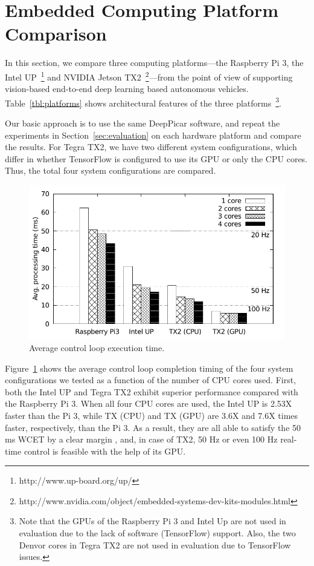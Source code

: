 
%

\section{Embedded Computing Platform Comparison}\label{sec:comparison}

In this section, we compare three computing platforms---the Raspberry
Pi 3, the Intel UP~\footnote{http://www.up-board.org/up/} and NVIDIA
Jetson
TX2~\footnote{http://www.nvidia.com/object/embedded-systems-dev-kits-modules.html}---from
the point of view of supporting vision-based end-to-end deep learning
based autonomous vehicles. 
Table~\ref{tbl:platforms} shows architectural features of the three
platforms~\footnote{Note that the GPUs of the Raspberry Pi 3 and Intel
  Up are not used in evaluation due to the lack of software (TensorFlow)
support. Also, the two Denvor cores in Tegra TX2 are not used in
evaluation due to TensorFlow issues.}.
  
Our basic approach is to use the same DeepPicar software, and repeat
the experiments in Section~\ref{sec:evaluation} on each hardware
platform and compare the results. 
For Tegra TX2, we have two different system configurations,
which differ in whether TensorFlow is configured to use its GPU or
only the CPU cores. Thus, the total four system configurations are
compared.

\begin{figure}[h]
  \centering
  \includegraphics[width=.5\textwidth]{figs/compare_core}
  \caption{Average control loop execution time.} 
  \label{fig:sys_core}
\end{figure}

Figure~\ref{fig:sys_core} shows the average control loop completion
timing of the four system configurations we tested as a function of
the number of CPU cores used.
First, both the Intel UP and Tegra TX2 exhibit superior performance
compared with the Raspberry Pi 3. 
When all four CPU cores are used, the Intel UP is 2.53X faster than
the Pi 3, while TX (CPU) and TX (GPU) are 3.6X and 7.6X times faster,
respectively, than the Pi 3. 
As a result, they are all able to satisfy the 50 ms 
WCET by a clear margin
, and, in case of TX2, 50 Hz or even 100 Hz real-time control is
feasible with the help of its GPU.


